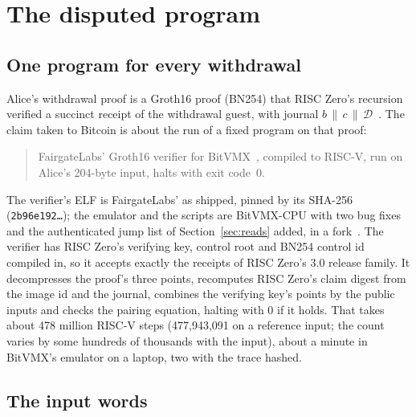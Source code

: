 \documentclass[11pt]{article}
\begin{document}
\section{The disputed program}
\label{sec:program}

\subsection{One program for every withdrawal}

Alice's withdrawal proof is a Groth16 proof (BN254) that RISC Zero's
recursion verified a succinct receipt of the withdrawal guest, with
journal $b \,\|\, c \,\|\, \mathcal{D}$~\cite{pipeline}. The claim taken to Bitcoin
is about the run of a fixed program on that proof:
\begin{quote}
FairgateLabs' Groth16 verifier for BitVMX~\cite{bitvmxcpu}, compiled to
RISC-V, run on Alice's 204-byte input, halts with exit code~0.
\end{quote}
The verifier's ELF is FairgateLabs' as shipped, pinned by its SHA-256
(\texttt{2b96e192\ldots}); the emulator and the scripts are BitVMX-CPU
with two bug fixes and the authenticated jump list of
Section~\ref{sec:reads} added, in a fork~\cite{bitvmxfork}. The verifier
has RISC Zero's verifying key, control root and BN254 control id
compiled in, so it accepts exactly the receipts of RISC Zero's 3.0
release family. It decompresses the proof's three points, recomputes
RISC Zero's claim digest from the image id and the journal, combines the
verifying key's points by the public inputs and checks the pairing
equation, halting with 0 if it holds. That takes about 478 million
RISC-V steps (477,943,091 on a reference input; the count varies by some
hundreds of thousands with the input), about a minute in BitVMX's
emulator on a laptop, two with the trace hashed.

\subsection{The input words}
\end{document}
